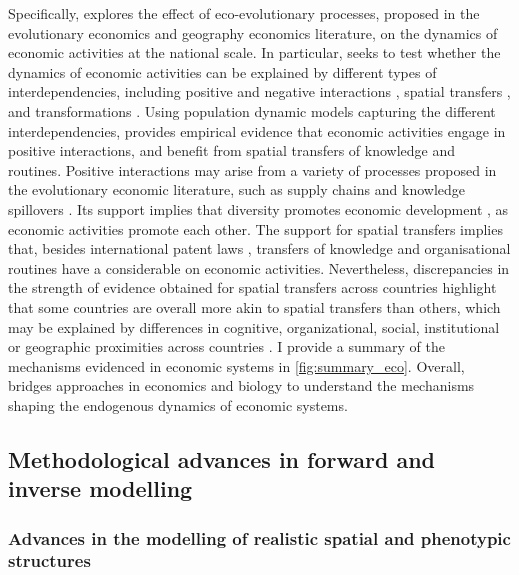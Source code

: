 Specifically, \chapiii explores the effect of eco-evolutionary processes, proposed in the evolutionary economics and geography economics literature, on the dynamics of economic activities at the national scale.
% 
In particular, \chapiii seeks to test whether the dynamics of economic activities can be explained by different types of interdependencies, including positive \xxx and negative interactions \xxx, spatial transfers \xxx, and transformations \xxx.
% 
Using population dynamic models capturing the different interdependencies, \chapiii provides empirical evidence that economic activities engage in positive interactions, and benefit from spatial transfers of knowledge and routines.
% 
Positive interactions may arise from a variety of processes proposed in the evolutionary economic literature, such as supply chains \cite{Ozman2009,Saavedra2009a} and knowledge spillovers \cite{Menon2015}. 
% 
Its support implies that diversity promotes economic development \cite{Hidalgo2018}, as economic activities promote each other.
% 
The support for spatial transfers implies that, besides international patent laws \xxx, transfers of knowledge and organisational routines have a considerable on economic activities. Nevertheless, discrepancies in the strength of evidence obtained for spatial transfers across countries highlight that some countries are overall more akin to spatial transfers than others, which may be explained by differences in cognitive, organizational, social, institutional or geographic proximities across countries \xxx .
% 
I provide a summary of the mechanisms evidenced in economic systems in \cref{fig:summary_eco}. Overall, \chapiii bridges approaches in economics and biology to understand the mechanisms shaping the endogenous dynamics of economic systems.

% 

% 

\subsection{Methodological advances in forward and inverse modelling}

\subsubsection{Advances in the modelling of realistic spatial and phenotypic structures}

